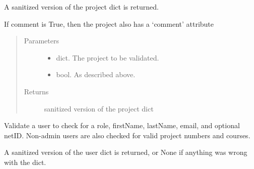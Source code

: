 \documentclass[letterpaper,10pt,english]{sphinxmanual}
\begin{document}
\begin{fulllineitems}
\begin{fulllineitems}
A sanitized version of the project dict is returned.

If comment is True, then the project also has a ‘comment’ attribute

\begin{sphinxVerbatim}[commandchars=\\\{\}]
 
       
             
\end{sphinxVerbatim}
\begin{quote}\begin{description}
\item[{Parameters}] \leavevmode\begin{itemize}
\item {} 
 \textendash{} dict. The project to be validated.

\item {} 
 \textendash{} bool. As described above.

\end{itemize}

\item[{Returns}] \leavevmode
sanitized version of the project dict

\end{description}\end{quote}

\end{fulllineitems}


\begin{fulllineitems}
\label{\detokenize{apidoc/utdesign_procurement:utdesign_procurement.apigateway.ApiGateway.validateUser}}
Validate a user to check for a role, firstName, lastName, email,
and optional netID. Non-admin users are also checked for valid
project numbers and courses.

A sanitized version of the user dict is returned, or None if anything
was wrong with the dict.


\end{fulllineitems}
\end{fulllineitems}
\end{document}

